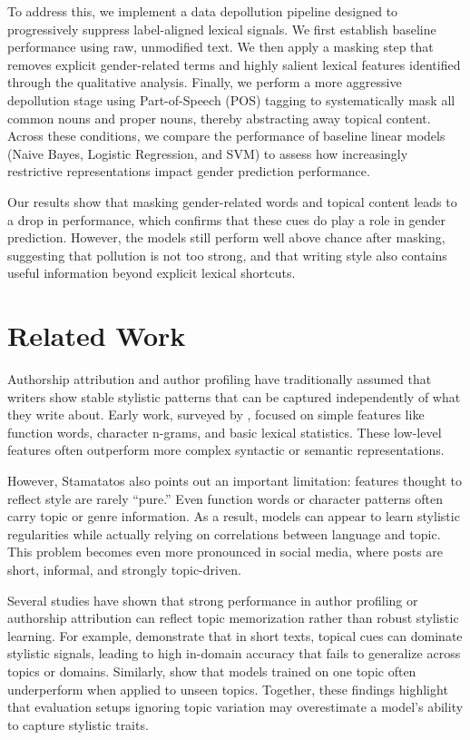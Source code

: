 \documentclass[11pt]{article}
\begin{document}
To address this, we implement a data depollution pipeline designed to progressively suppress label-aligned lexical signals. We first establish baseline performance using raw, unmodified text. We then apply a masking step that removes explicit gender-related terms and highly salient lexical features identified through the qualitative analysis. Finally, we perform a more aggressive depollution stage using Part-of-Speech (POS) tagging to systematically mask all common nouns and proper nouns, thereby abstracting away topical content. Across these conditions, we compare the performance of baseline linear models (Naive Bayes, Logistic Regression, and SVM) to assess how increasingly restrictive representations impact gender prediction performance.

Our results show that masking gender-related words and topical content leads to a
drop in performance, which confirms that these cues do play a role in gender
prediction. However, the models still perform well above chance after
masking, suggesting that pollution is not too strong, and that writing style also contains useful information beyond explicit lexical shortcuts.


\section{Related Work}

Authorship attribution and author profiling have traditionally assumed that writers show stable stylistic patterns that can be captured independently of what they write about. Early work, surveyed by \citet{stamatatos2009survey}, focused on simple features like function words, character n-grams, and basic lexical statistics. These low-level features often outperform more complex syntactic or semantic representations.

However, Stamatatos also points out an important limitation: features thought to reflect style are rarely “pure.” Even function words or character patterns often carry topic or genre information. As a result, models can appear to learn stylistic regularities while actually relying on correlations between language and topic. This problem becomes even more pronounced in social media, where posts are short, informal, and strongly topic-driven.

Several studies have shown that strong performance in author profiling or authorship attribution can reflect topic memorization rather than robust stylistic learning. For example, \citet{sari2018topic} demonstrate that in short texts, topical cues can dominate stylistic signals, leading to high in-domain accuracy that fails to generalize across topics or domains. Similarly, \citet{sundararajan2018what} show that models trained on one topic often underperform when applied to unseen topics. Together, these findings highlight that evaluation setups ignoring topic variation may overestimate a model’s ability to capture stylistic traits.
\end{document}
